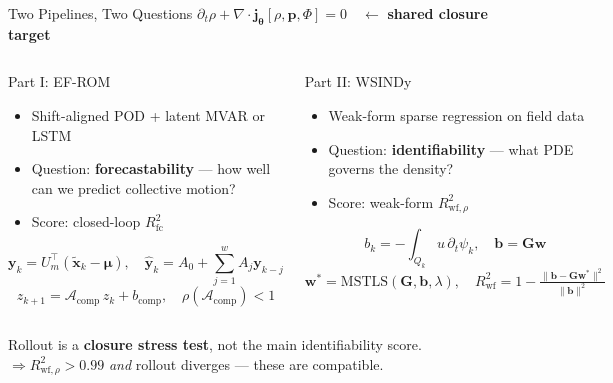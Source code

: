 \begin{frame}[shrink=25]{Two Pipelines, Two Questions}
\large\centering
$\partial_t\rho + \nabla\!\cdot\mathbf{j}_{\boldsymbol\theta}[\rho,\mathbf{p},\Phi]=0\quad\longleftarrow$ \textbf{shared closure target}\\[0.5em]
\begin{columns}[T]
\begin{block}{Part I: EF-ROM}
\normalsize
\begin{itemize}\setlength{\itemsep}{0.4em}
  \item Shift-aligned POD + latent MVAR or LSTM
  \item Question: \textbf{forecastability} --- how well can we predict collective motion?
  \item Score: closed-loop $R^2_{\mathrm{fc}}$
\end{itemize}
\vspace{0.1em}\small
\[
\mathbf{y}_k = U_m^\top(\tilde{\mathbf{x}}_k{-}\boldsymbol{\mu}),\quad
\hat{\mathbf{y}}_k = A_0{+}\sum_{j=1}^{w}A_j\mathbf{y}_{k-j}
\]
\[
z_{k+1} = \mathcal{A}_{\mathrm{comp}}\,z_k + b_{\mathrm{comp}},\quad\rho(\mathcal{A}_{\mathrm{comp}}){<}1
\]
\end{block}

\begin{block}{Part II: WSINDy}
\normalsize
\begin{itemize}\setlength{\itemsep}{0.4em}
  \item Weak-form sparse regression on field data
  \item Question: \textbf{identifiability} --- what PDE governs the density?
  \item Score: weak-form $R^2_{\mathrm{wf},\rho}$
\end{itemize}
\vspace{0.1em}\small
\[
b_k=-\!\int_{Q_k}\!u\,\partial_t\psi_k,\quad
\mathbf{b}=\mathbf{G}\mathbf{w}
\]
\[
\mathbf{w}^*=\mathrm{MSTLS}(\mathbf{G},\mathbf{b},\lambda),\quad
R^2_{\mathrm{wf}}=1-\tfrac{\|\mathbf{b}-\mathbf{G}\mathbf{w}^*\|^2}{\|\mathbf{b}\|^2}
\]
\end{block}
\end{columns}

\bigskip
\centering
\large
Rollout is a \textbf{closure stress test}, not the main identifiability score.\\[0.4em]
$\Rightarrow$\quad $R^2_{\mathrm{wf},\rho}{>}0.99$ \emph{and} rollout diverges --- these are compatible.
\end{frame}

